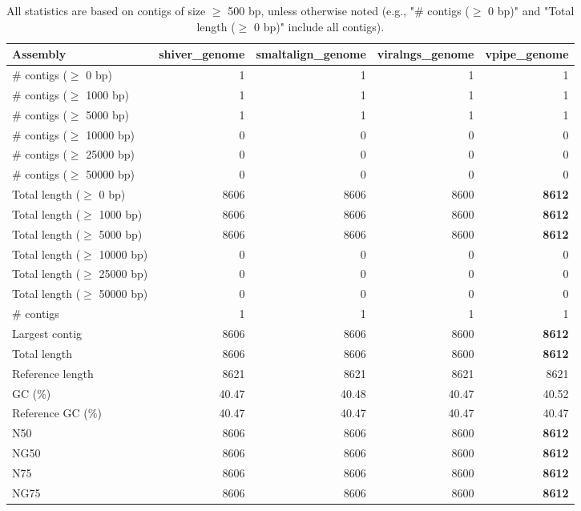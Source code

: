\documentclass[12pt,a4paper]{article}
\begin{document}
\begin{table}[ht]
\begin{center}
\caption{All statistics are based on contigs of size $\geq$ 500 bp, unless otherwise noted (e.g., "\# contigs ($\geq$ 0 bp)" and "Total length ($\geq$ 0 bp)" include all contigs).}
\begin{tabular}{|l*{4}{|r}|}
\hline
Assembly & shiver\_genome & smaltalign\_genome & viralngs\_genome & vpipe\_genome \\ \hline
\# contigs ($\geq$ 0 bp) & 1 & 1 & 1 & 1 \\ \hline
\# contigs ($\geq$ 1000 bp) & 1 & 1 & 1 & 1 \\ \hline
\# contigs ($\geq$ 5000 bp) & 1 & 1 & 1 & 1 \\ \hline
\# contigs ($\geq$ 10000 bp) & 0 & 0 & 0 & 0 \\ \hline
\# contigs ($\geq$ 25000 bp) & 0 & 0 & 0 & 0 \\ \hline
\# contigs ($\geq$ 50000 bp) & 0 & 0 & 0 & 0 \\ \hline
Total length ($\geq$ 0 bp) & 8606 & 8606 & 8600 & {\bf 8612} \\ \hline
Total length ($\geq$ 1000 bp) & 8606 & 8606 & 8600 & {\bf 8612} \\ \hline
Total length ($\geq$ 5000 bp) & 8606 & 8606 & 8600 & {\bf 8612} \\ \hline
Total length ($\geq$ 10000 bp) & 0 & 0 & 0 & 0 \\ \hline
Total length ($\geq$ 25000 bp) & 0 & 0 & 0 & 0 \\ \hline
Total length ($\geq$ 50000 bp) & 0 & 0 & 0 & 0 \\ \hline
\# contigs & 1 & 1 & 1 & 1 \\ \hline
Largest contig & 8606 & 8606 & 8600 & {\bf 8612} \\ \hline
Total length & 8606 & 8606 & 8600 & {\bf 8612} \\ \hline
Reference length & 8621 & 8621 & 8621 & 8621 \\ \hline
GC (\%) & 40.47 & 40.48 & 40.47 & 40.52 \\ \hline
Reference GC (\%) & 40.47 & 40.47 & 40.47 & 40.47 \\ \hline
N50 & 8606 & 8606 & 8600 & {\bf 8612} \\ \hline
NG50 & 8606 & 8606 & 8600 & {\bf 8612} \\ \hline
N75 & 8606 & 8606 & 8600 & {\bf 8612} \\ \hline
NG75 & 8606 & 8606 & 8600 & {\bf 8612} \\ \hline

\end{tabular}
\end{center}
\end{table}
\end{document}
